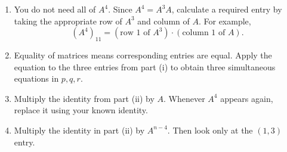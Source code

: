 \begin{hint}
\begin{enumerate} 
\item[(i)] You do not need all of \(A^4\). Since \(A^4=A^3A\), calculate a required entry by taking the appropriate row of \(A^3\) and column of \(A\). For example, \[ (A^4)_{11} = (\text{row 1 of }A^3) \cdot (\text{column 1 of }A). \] 
\item[(ii)] Equality of matrices means corresponding entries are equal. Apply the equation to the three entries from part (i) to obtain three simultaneous equations in \(p,q,r\). 
\item[(iii)] Multiply the identity from part (ii) by \(A\). Whenever \(A^4\) appears again, replace it using your known identity. 
\item[(iv)] Multiply the identity in part (ii) by \(A^{n-4}\). Then look only at the \((1,3)\) entry. 
\end{enumerate}
\end{hint}

